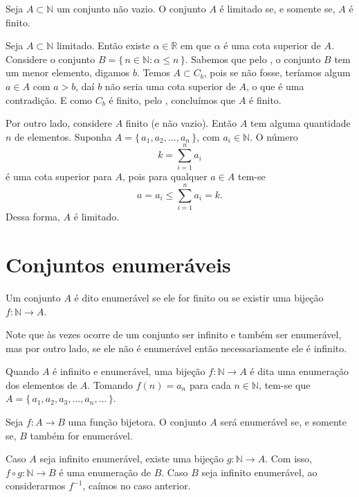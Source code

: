 \documentclass[../main.tex]{subfiles}
\begin{document}
\begin{teo}\label{enum-teo-finitoLimitado}
    Seja $A \subset \mathbb{N}$ um conjunto não vazio. O conjunto $A$ é limitado se, e somente se, $A$ é finito.
\end{teo}
\begin{dem}
    Seja $A \subset \mathbb{N}$ limitado. Então existe $\alpha \in \mathbb{R}$ em que $\alpha$ é uma cota superior de $A$. Considere o conjunto $B = \{\,n \in \mathbb{N} : \alpha \leq n \,\}$.
    Sabemos que pelo , o conjunto $B$ tem um menor elemento, digamos $b$. Temos $A \subset C_b$, pois se não fosse, teríamos algum 
    $a \in A$ com $a > b$, daí $b$ não seria uma cota superior de $A$, o que é uma contradição. E como $C_b$ é finito, pelo , concluímos que $A$ é finito.

    Por outro lado, considere $A$ finito (e não vazio). Então $A$ tem alguma quantidade $n$ de elementos. Suponha $A = \{\,a_1, a_2, ..., a_n\,\}$, com $a_i \in \mathbb{N}$. O número 
    \[ k = \sum_{i=1}^n a_i \]
    é uma cota superior para $A$, pois para qualquer $a \in A$ tem-se 
    \[ a = a_i \leq \sum_{i=1}^n a_i = k. \] 
    Dessa forma, $A$ é limitado.
\end{dem}

\section{Conjuntos enumeráveis}
\begin{defi}\label{enum-def-conjuntoEnumeravel}
    Um conjunto $A$ é dito enumerável se ele for finito ou se existir uma bijeção $f: \mathbb{N} \to A$.
\end{defi}
Note que às vezes ocorre de um conjunto ser infinito e também ser enumerável, mas por outro lado, se ele não é enumerável então necessariamente ele é infinito.

Quando $A$ é infinito e enumerável, uma bijeção $f \colon \mathbb{N} \to A$ é dita uma enumeração dos elementos de $A$. Tomando $f(n) = a_n$ para cada $n \in \mathbb{N}$, tem-se que $A = \{\,a_1, a_2, a_3, ..., a_n, ...\,\}$.

\begin{prop}
    Seja $f \colon A \to B$ uma função bijetora. O conjunto $A$ será enumerável se, e somente se, $B$ também for enumerável.
\end{prop}
\begin{dem}
    Caso $A$ seja infinito enumerável, existe uma bijeção $g \colon \mathbb{N} \to A$. Com isso, $f \circ g \colon \mathbb{N} \to B$ é uma enumeração de $B$.
    Caso $B$ seja infinito enumerável, ao considerarmos $f^{-1}$, caímos no caso anterior.
\end{dem}
\end{document}
